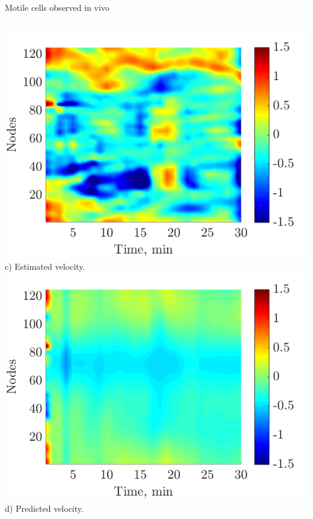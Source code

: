 \documentclass[mathserif,11pt]{beamer}
\begin{document}
\begin{frame}{Motile cells observed in vivo}
\begin{columns}
\begin{column}{0.5\textwidth}
		\includegraphics[scale=0.3]{Figures/m4_estimated_velocity.png}\vfil
		\footnotesize{c) Estimated velocity.}
		\vfil
		\includegraphics[scale=0.3]{Figures/m4_modelled_velocity.png}\vfil
		\footnotesize{d) Predicted velocity.}
	\end{column}
\end{columns}
\end{frame}
\end{document}
